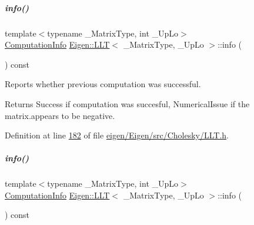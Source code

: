 \mbox{\label{group___cholesky___module_adb1295e7d2b1fd825a041345ae08be54}} 
\subparagraph{\texorpdfstring{info()}{info()}\hspace{0.1cm}{\footnotesize\ttfamily [1/2]}}
{\footnotesize\ttfamily template$<$typename \+\_\+\+Matrix\+Type, int \+\_\+\+Up\+Lo$>$ \\
\hyperlink{group__enums_ga85fad7b87587764e5cf6b513a9e0ee5e}{Computation\+Info} \hyperlink{group___cholesky___module_class_eigen_1_1_l_l_t}{Eigen\+::\+L\+LT}$<$ \+\_\+\+Matrix\+Type, \+\_\+\+Up\+Lo $>$\+::info (\begin{DoxyParamCaption}{ }\end{DoxyParamCaption}) const\hspace{0.3cm}{\ttfamily [inline]}}



Reports whether previous computation was successful. 

\begin{DoxyReturn}{Returns}
{\ttfamily Success} if computation was succesful, {\ttfamily Numerical\+Issue} if the matrix.\+appears to be negative. 
\end{DoxyReturn}


Definition at line \hyperlink{eigen_2_eigen_2src_2_cholesky_2_l_l_t_8h_source_l00182}{182} of file \hyperlink{eigen_2_eigen_2src_2_cholesky_2_l_l_t_8h_source}{eigen/\+Eigen/src/\+Cholesky/\+L\+L\+T.\+h}.

\mbox{\label{group___cholesky___module_adb1295e7d2b1fd825a041345ae08be54}} 
\subparagraph{\texorpdfstring{info()}{info()}\hspace{0.1cm}{\footnotesize\ttfamily [2/2]}}
{\footnotesize\ttfamily template$<$typename \+\_\+\+Matrix\+Type, int \+\_\+\+Up\+Lo$>$ \\
\hyperlink{group__enums_ga85fad7b87587764e5cf6b513a9e0ee5e}{Computation\+Info} \hyperlink{group___cholesky___module_class_eigen_1_1_l_l_t}{Eigen\+::\+L\+LT}$<$ \+\_\+\+Matrix\+Type, \+\_\+\+Up\+Lo $>$\+::info (\begin{DoxyParamCaption}{ }\end{DoxyParamCaption}) const\hspace{0.3cm}{\ttfamily [inline]}}



